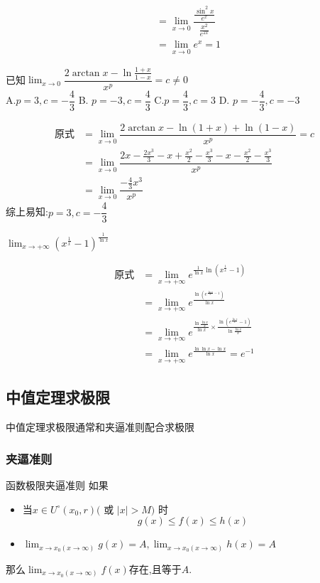 \documentclass[8pt a4paper, oneside, UTF8]{ctexbook}
\begin{document}
\begin{sloppypar}
\begin{solution}
\begin{align*}
            & =\lim_{x \to 0} \dfrac{\frac{\sin^2 x}{e^x}}{\frac{x^2}{e^{2x}}}\\
            & =\lim_{x \to 0} e^x=1
        \end{align*}
    \end{solution}
    \begin{problem}
        已知$\lim_{x\to 0}\dfrac{2\arctan x-\ln\frac{1+x}{1-x}}{x^p}=c \neq 0$\\
        A.$p=3,c=-\dfrac43$ \qquad B. $p=-3,c=\dfrac{4}{3}$ \qquad C.$p=\dfrac{4}{3},c=3$ \qquad D. $p= - \dfrac 43,c= - 3$
    \end{problem}
    \begin{solution}
        \begin{align*}
          \text{原式} & =\lim_{x\to0} \dfrac{2\arctan x-\ln(1+x)+\ln(1-x)}{x^p}=c\\    
          & =   \lim_{x\to0} \dfrac{2x-\frac{2x^3}{3}-x+\frac{x^2}{2}-\frac{x^3}{3}-x-\frac{x^2}{2}-\frac{x^3}{3}}{x^p}\\
          & = \lim_{x\to 0}\dfrac{-\frac{4}{3}x^3}{x^p}
        \end{align*}
        综上易知:$p=3,c=-\dfrac{4}{3}$
    \end{solution}
    \begin{problem}
        $\lim_{x\to+\infty}\left(x^{\frac{1}{x}}-1\right)^{\frac{1}{\ln x}}$
    \end{problem}
    \begin{solution}
        \begin{align*}
          \text{原式} & =\lim_{x\to+\infty} e^{\frac{1}{\ln x}\ln(x^\frac{1}{x}-1)} \\
          & = \lim_{x\to+\infty} e^{\frac{\ln(e^{\frac{\ln x}{x}-1})}{\ln x}} \\
          & = \lim_{x\to+\infty} e^{\frac{\ln{\frac{\ln x}{x}}}{\ln x}\times \frac{\ln(e^\frac{\ln x}{x}-1)}{\ln\frac{\ln x}{x}}}\\
          & = \lim_{x\to+\infty} e^{\frac{\ln \ln x-\ln x}{\ln x}} = e^{-1}
        \end{align*}
    \end{solution}
    \subsection{中值定理求极限}
    中值定理求极限通常和夹逼准则配合求极限
    \subsubsection{夹逼准则}
    \begin{defn}{函数极限夹逼准则}{}
        如果
        \begin{itemize}
            \item 当$x\in U^{\circ}(x_{0},r)($ 或 $|x|>M)$ 时
                  $$
                      g(x)\leqslant f(x) \leqslant h(x)
                  $$
            \item $\lim_{x\to x_0(x\to\infty)}g(x)=A,\lim_{x\to x_0(x\to\infty)}h(x)=A$
        \end{itemize}
        那么$\lim_{x\to x_0(x\to\infty)}f(x)$存在,且等于$A$.
    \end{defn}

\end{sloppypar}
\end{document}

